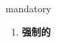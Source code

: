 
\begin{frame}
{\huge mandatory}
\begin{center}
\begin{enumerate}\Large
  \item \textbf{强制的}
\end{enumerate}
\end{center}
\end{frame}
